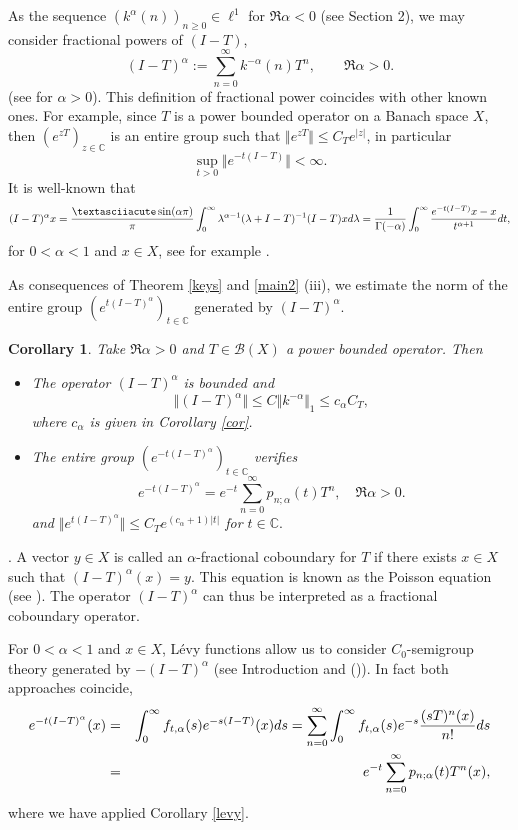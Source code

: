 \documentclass[a4paper,12pt]{amsart}
\def\CC{\mathbb C}
\def\CC{\mathbb C}
\newtheorem{corollary}[thm]{Corollary}
\theoremstyle{definition}
\theoremstyle{remark}
\begin{document}
As the sequence $(k^{\alpha}(n))_{n\ge 0}\in \ell^1$ for $ \Re \alpha<0$ (see Section 2), we may consider  fractional powers of $(I-T)$,
$$
(I-T)^{\alpha}:=\sum_{n=0}^{\infty}k^{-\alpha}(n)T^n,  \qquad \Re \alpha >0.
$$
(see \cite[Section 6]{LR} for $\alpha>0$). This definition of fractional power coincides with other known ones. For example, since $T$ is a power bounded operator on a Banach space $X$, then $(e^{zT})_{z\in \CC}$ is an entire group such that $\Vert e^{zT}\Vert\le C_Te^{\vert z\vert}$, in particular
 $$
 \sup_{t>0}\Vert e^{-t(I-T)}\Vert<\infty.
 $$
 It is well-known that
 $$
 (I-T)^{\alpha}x={´\sin(\alpha \pi)\over \pi}\int_0^\infty\lambda^{\alpha-1}(\lambda+I-T)^{-1}(I-T)xd\lambda={1\over \Gamma(-\alpha)}\int_0^\infty {e^{-t(I-T)}x-x\over t^{\alpha+1}}dt,
 $$
for $0<\alpha<1$ and  $x\in X$, see for example \cite[Chapter IX]{Yo80}.




As consequences of Theorem \ref{keys} and   \ref{main2} (iii), we estimate the norm of the entire group $(e^{t(I-T)^\alpha})_{t\in \CC}$ generated by $(I-T)^{\alpha}$.



\begin{corollary}\label{poww} Take $\Re \alpha >0$ and $T\in {\mathcal B}(X)$ a power bounded operator. Then
\begin{itemize}
\item[(i)] The operator $(I-T)^{\alpha}$ is bounded and
$$\Vert (I-T)^{\alpha}\Vert\le C \Vert k^{-\alpha}\Vert_1\le c_\alpha C_T,
$$
where $c_\alpha$ is given in Corollary \ref{cor}.
\item[(ii)] The entire group $(e^{-t(I-T)^\alpha})_{t\in \CC}$ verifies
$$
e^{-t(I-T)^\alpha}=e^{-t} \sum_{n=0}^\infty p_{n;\alpha}(t)T^n, \quad \Re \alpha>0.
$$
and $\Vert e^{t(I-T)^\alpha}\Vert\le C_T e^{(c_\alpha+1)\vert t\vert}$ for $t\in \CC.$
\end{itemize}

\end{corollary}

. A vector $y\in X$ is called an $\alpha$-fractional coboundary for $T$ if there exists $x\in X$ such that $(I-T)^\alpha (x)=y$. This equation is known as the Poisson equation (see \cite{ALG, DL}). The operator $(I-T)^\alpha$ can thus be interpreted as a fractional coboundary operator.



 For $0<\alpha<1$ and $x\in X$, L\'{e}vy functions allow us to consider $C_0$-semigroup theory generated by $-(I-T)^\alpha$  (see Introduction and (\cite[Chapter IX]{Yo80})). In fact both approaches coincide,
 \begin{eqnarray*}
 e^{-t(I-T)^\alpha}(x)&=&\int_0^\infty f_{t,\alpha}(s) e^{-s(I-T)}(x)ds=\sum_{n=0}^\infty\int_0^\infty f_{t,\alpha}(s) e^{-s}{(sT)^n(x)\over n!}ds\cr
 &=& e^{-t}\sum_{n=0}^\infty p_{n;\alpha}(t)T^n(x),
\end{eqnarray*}
 where we have applied Corollary \ref{levy}.
\end{document}
